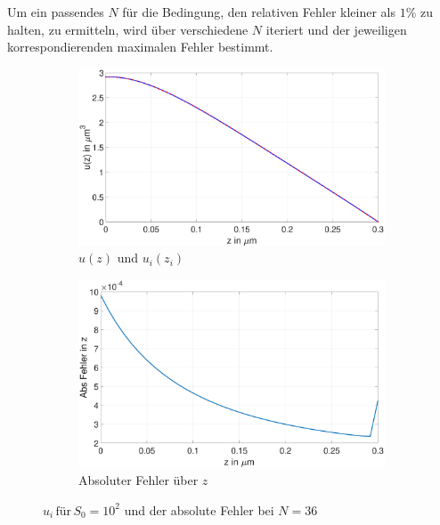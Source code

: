 Um ein passendes $N$ für die Bedingung, den relativen Fehler kleiner als $1\%$ zu halten, zu ermitteln, wird über verschiedene $N$ iteriert und der jeweiligen korrespondierenden maximalen Fehler bestimmt.
\begin{figure}[h]
		\begin{subfigure}[b]{0.5\textwidth}
		\includegraphics[width=\textwidth]{figures/station_gl_2_1/S0}
		\caption{$u(z)$ und $u_{i}(z_i)$}
	\end{subfigure}
	\hfill
	\begin{subfigure}[b]{0.5\textwidth}
		\includegraphics[width=1\linewidth]{figures/station_gl_2_1/S0_fehler}
		\caption{Absoluter Fehler über $z$}
	\end{subfigure}
	\caption{$u_i \,\text{für} \, S_0=10^2$ und der absolute Fehler bei $N=36$ }
\end{figure}

